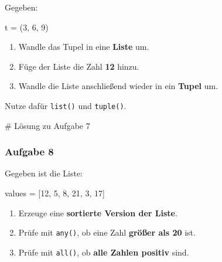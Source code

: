 \documentclass[
  11pt,
  a4paper,
  DIV=11,
  numbers=noendperiod]{scrartcl}
\newenvironment{Shaded}{\begin{snugshade}}{\end{snugshade}}
\newcommand{\CommentTok}[1]{\textcolor[rgb]{0.37,0.37,0.37}{#1}}
\newcommand{\DecValTok}[1]{\textcolor[rgb]{0.68,0.00,0.00}{#1}}
\newcommand{\NormalTok}[1]{\textcolor[rgb]{0.00,0.23,0.31}{#1}}
\newcommand{\OperatorTok}[1]{\textcolor[rgb]{0.37,0.37,0.37}{#1}}
\providecommand{\tightlist}{%
  \setlength{\itemsep}{0pt}\setlength{\parskip}{0pt}}
\begin{document}
Gegeben:

\begin{Shaded}
\begin{Highlighting}[numbers=left,,]
\NormalTok{t }\OperatorTok{=}\NormalTok{ (}\DecValTok{3}\NormalTok{, }\DecValTok{6}\NormalTok{, }\DecValTok{9}\NormalTok{)}
\end{Highlighting}
\end{Shaded}

\begin{enumerate}
\def\labelenumi{\arabic{enumi}.}
\tightlist
\item
  Wandle das Tupel in eine \textbf{Liste} um.\\
\item
  Füge der Liste die Zahl \textbf{12} hinzu.\\
\item
  Wandle die Liste anschließend wieder in ein \textbf{Tupel} um.
\end{enumerate}

Nutze dafür \texttt{list()} und \texttt{tuple()}.

\begin{Shaded}
\begin{Highlighting}[numbers=left,,]
\CommentTok{\# Lösung zu Aufgabe 7}
\end{Highlighting}
\end{Shaded}

\subsubsection{Aufgabe 8}\label{aufgabe-8}

Gegeben ist die Liste:

\begin{Shaded}
\begin{Highlighting}[numbers=left,,]
\NormalTok{values }\OperatorTok{=}\NormalTok{ [}\DecValTok{12}\NormalTok{, }\DecValTok{5}\NormalTok{, }\DecValTok{8}\NormalTok{, }\DecValTok{21}\NormalTok{, }\DecValTok{3}\NormalTok{, }\DecValTok{17}\NormalTok{]}
\end{Highlighting}
\end{Shaded}

\begin{enumerate}
\def\labelenumi{\arabic{enumi}.}
\tightlist
\item
  Erzeuge eine \textbf{sortierte Version der Liste}.\\
\item
  Prüfe mit \texttt{any()}, ob eine Zahl \textbf{größer als 20} ist.\\
\item
  Prüfe mit \texttt{all()}, ob \textbf{alle Zahlen positiv} sind.
\end{enumerate}
\end{document}
